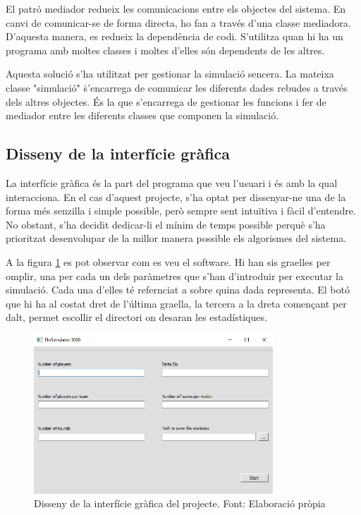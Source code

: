 \documentclass[a4paper]{article}
\begin{document}
El patró mediador redueix les comunicacions entre els objectes del sistema. En canvi de comunicar-se de forma directa, ho fan a través d'una classe mediadora. D'aquesta manera, es redueix la dependència de codi. S'utilitza quan hi ha un programa amb moltes classes i moltes d'elles són dependents de les altres.

Aquesta solució s'ha utilitzat per gestionar la simulació sencera. La mateixa classe "simulació" \. s'encarrega de comunicar les diferents dades rebudes a través dels altres objectes. És la que s'encarrega de gestionar les funcions i fer de mediador entre les diferents classes que componen la simulació.

\subsection{Disseny de la interfície gràfica}

La interfície gràfica és la part del programa que veu l'usuari i és amb la qual interacciona. En el cas d'aquest projecte, s'ha optat per dissenyar-ne una de la forma més senzilla i simple possible, però sempre sent intuïtiva i fàcil d'entendre. No obstant, s'ha decidit dedicar-li el mínim de temps possible perquè s'ha prioritzat desenvolupar de la millor manera possible els algorismes del sistema. 

A la figura \ref{fig:UiTFG} es pot observar com es veu el software. Hi han sis graelles per omplir, una per cada un dels paràmetres que s'han d'introduir per executar la simulació. Cada una d'elles té refernciat a sobre quina dada representa. El botó que hi ha al costat dret de l'última graella, la tercera a la dreta començant per dalt, permet escollir el directori on desaran les estadístiques.

\begin{figure} [H]
    \centering
    \includegraphics[width=0.8\textwidth]{images/UiTFG.png}
    \caption{Disseny de la interfície gràfica del projecte. Font: Elaboració pròpia}
    \label{fig:UiTFG}
\end{figure}
\end{document}
